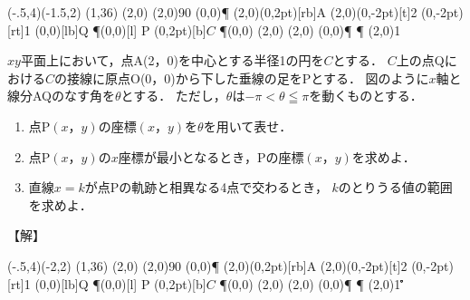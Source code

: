 \documentclass[fleqn]{jarticle}
\begin{document}
\begin{mawarikomi}{50mm}{\vspace{.5ex}\par
{}\small%
\begin{zahyou}(-.5,4)(-1.5,2)%
\def\O{(0,0)}%
\def\A{(2,0)}%
\def\kaku{36}%
\kyokuTyoku(1,\kaku)\Q%
\Addvec\A\Q\Q%
\Kaiten\Q\A{90}\R%
\Suisen\O\Q\R\P%
\Put\A(0,2pt)[rb]{A}%
\Put\A(0,-2pt)[t]{2}%
(0,-2pt)[rt]{1 }%
\Put\Q(0,0)[lb]{Q}%
\Put\P(0,0)[l]{ P}%
(0,2pt)[b]{$C$}%
\Tyokkaku\P\O
\Tyokkaku\Q\A
{}\A{}%
\Drawline{\A\Q}%
\Tyokusen\O\P\xmin[y]\ymax
\Tyokusen\P\Q[y]\ymax\xmax
\En\A{1}%
\end{zahyou}}%
$xy$平面上において，点A(2，0)を中心とする半径1の円を$C$とする．
$C$上の点Qにおける$C$の接線に原点O(0，0)から下した垂線の足をPとする．
図のように$x$軸と線分AQのなす角を$\theta$とする．
ただし，$\theta$は$-\pi<\theta\leqq \pi$を動くものとする．
\begin{enumerate}[(1)]
  \item 点P$(x，y)$の座標$(x，y)$を$\theta$を用いて表せ．
  \item 点P$(x，y)$の$x$座標が最小となるとき，Pの座標$(x，y)$を求めよ．
  \item 直線$x=k$が点Pの軌跡と相異なる4点で交わるとき，
    $k$のとりうる値の範囲を求めよ．
\end{enumerate}
\end{mawarikomi}

【解】\par
{\small%
\begin{zahyou}(-.5,4)(-2,2)%
\def\O{(0,0)}%
\def\A{(2,0)}%
\def\kaku{36}%
\kyokuTyoku(1,\kaku)\Q%
\Addvec\A\Q\Q%
\Kaiten\Q\A{90}\R%
\Suisen\O\Q\R\P%
\Put\A(0,2pt)[rb]{A}%
\Put\A(0,-2pt)[t]{2}%
(0,-2pt)[rt]{1 }%
\Put\Q(0,0)[lb]{Q}%
\Put\P(0,0)[l]{ P}%
(0,2pt)[b]{$C$}%
\Tyokkaku\P\O
\Tyokkaku\Q\A
{}\A{}%
\Drawline{\A\Q}%
\Tyokusen\O\P\xmin[y]\ymax
\Tyokusen\P\Q[y]\ymax\xmax
\En\A{1}%
\def\Fnr#1#2{\Cos{#1}\r{}\r\r{}\r\r\edef#2{\r}}%
{\thicklines\rGurafu\Fnr0\Pii}%
\end{zahyou}}%
\end{document}
